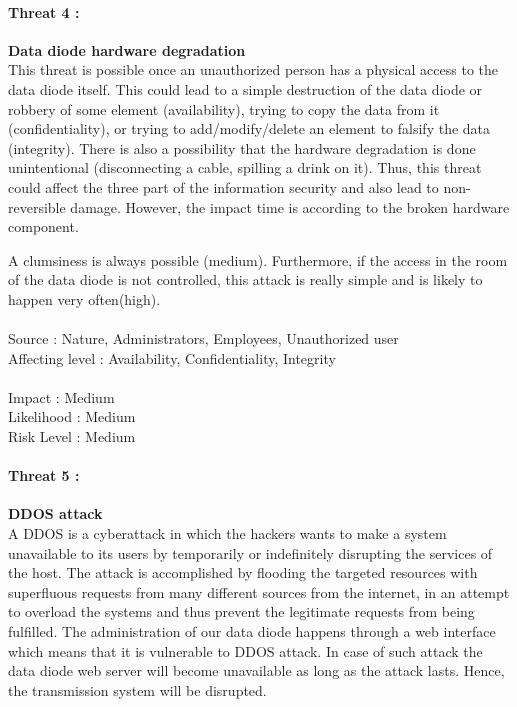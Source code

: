 \documentclass[a4paper,10pt]{article}
\begin{document}
\paragraph{Threat 4 :}  \textbf{Data diode hardware degradation}\\
\indent This threat is possible once an unauthorized person has a physical access to the data diode itself. This could lead to a simple destruction of the data diode or robbery of some element (availability), trying to copy the data from it (confidentiality), or trying to add/modify/delete an element to falsify the data (integrity). There is also a possibility that the hardware degradation is done unintentional (disconnecting a cable, spilling a drink on it).
Thus, this threat could affect the three part of the information security and also lead to non-reversible damage. However, the impact time is according to the broken hardware component. 

A clumsiness is always possible (medium). Furthermore, if the access in the room of the data diode is not controlled, this attack is really simple and is likely to happen very often(high). \\ \\
Source : Nature, Administrators, Employees, Unauthorized user  \\ 
Affecting level : Availability, Confidentiality, Integrity \\ \\
Impact : Medium \\
Likelihood : Medium \\
Risk Level : Medium

\paragraph{Threat 5 :}  \textbf{DDOS attack} \\
\indent A DDOS is a cyberattack in which the hackers wants to make a system unavailable to its users by temporarily or indefinitely disrupting the services of the host. The attack is accomplished by flooding the targeted resources with superfluous requests from many different sources from the internet, in an attempt to overload the systems and thus prevent the legitimate requests from being fulfilled. The administration of our data diode happens through a web interface which means that it is vulnerable to DDOS attack. In case of such attack the data diode web server will become unavailable as long as the attack lasts. Hence, the transmission system will be disrupted.
\end{document}

